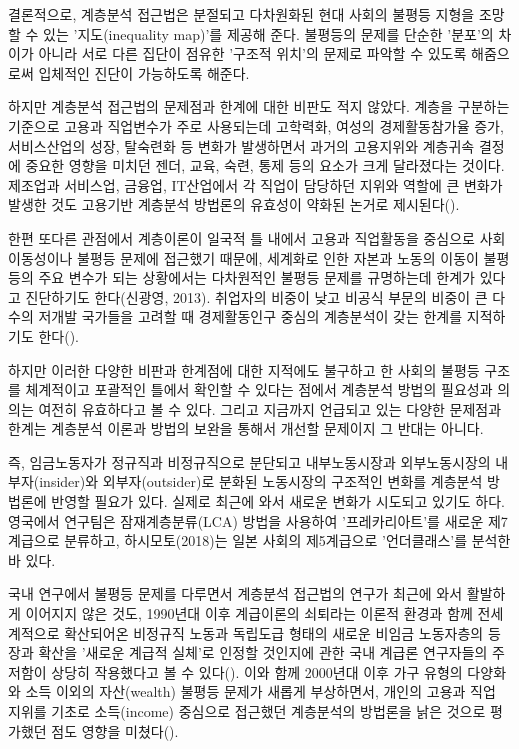 \documentclass[
  letterpaper,
  DIV=11,
  numbers=noendperiod]{scrartcl}
\begin{document}
결론적으로, 계층분석 접근법은 분절되고 다차원화된 현대 사회의 불평등
지형을 조망할 수 있는 '지도(inequality map)'를 제공해 준다. 불평등의
문제를 단순한 '분포'의 차이가 아니라 서로 다른 집단이 점유한 '구조적
위치'의 문제로 파악할 수 있도록 해줌으로써 입체적인 진단이 가능하도록
해준다.

하지만 계층분석 접근법의 문제점과 한계에 대한 비판도 적지 않았다. 계층을
구분하는 기준으로 고용과 직업변수가 주로 사용되는데 고학력화, 여성의
경제활동참가율 증가, 서비스산업의 성장, 탈숙련화 등 변화가 발생하면서
과거의 고용지위와 계층귀속 결정에 중요한 영향을 미치던 젠더, 교육, 숙련,
통제 등의 요소가 크게 달라졌다는 것이다. 제조업과 서비스업, 금융업,
IT산업에서 각 직업이 담당하던 지위와 역할에 큰 변화가 발생한 것도
고용기반 계층분석 방법론의 유효성이 약화된 논거로
제시된다().

한편 또다른 관점에서 계층이론이 일국적 틀 내에서 고용과 직업활동을
중심으로 사회이동성이나 불평등 문제에 접근했기 때문에, 세계화로 인한
자본과 노동의 이동이 불평등의 주요 변수가 되는 상황에서는 다차원적인
불평등 문제를 규명하는데 한계가 있다고 진단하기도 한다(신광영, 2013).
취업자의 비중이 낮고 비공식 부문의 비중이 큰 다수의 저개발 국가들을
고려할 때 경제활동인구 중심의 계층분석이 갖는 한계를 지적하기도
한다().

하지만 이러한 다양한 비판과 한계점에 대한 지적에도 불구하고 한 사회의
불평등 구조를 체계적이고 포괄적인 틀에서 확인할 수 있다는 점에서
계층분석 방법의 필요성과 의의는 여전히 유효하다고 볼 수 있다. 그리고
지금까지 언급되고 있는 다양한 문제점과 한계는 계층분석 이론과 방법의
보완을 통해서 개선할 문제이지 그 반대는 아니다.

즉, 임금노동자가 정규직과 비정규직으로 분단되고 내부노동시장과
외부노동시장의 내부자(insider)와 외부자(outsider)로 분화된 노동시장의
구조적인 변화를 계층분석 방법론에 반영할 필요가 있다. 실제로 최근에 와서
새로운 변화가 시도되고 있기도 하다. 영국에서 연구팀은 잠재계층분류(LCA)
방법을 사용하여 '프레카리아트'를 새로운 제7계급으로 분류하고,
하시모토(2018)는 일본 사회의 제5계급으로 '언더클래스'를 분석한 바 있다.

국내 연구에서 불평등 문제를 다루면서 계층분석 접근법의 연구가 최근에
와서 활발하게 이어지지 않은 것도, 1990년대 이후 계급이론의 쇠퇴라는
이론적 환경과 함께 전세계적으로 확산되어온 비정규직 노동과 독립도급
형태의 새로운 비임금 노동자층의 등장과 확산을 '새로운 계급적 실체'로
인정할 것인지에 관한 국내 계급론 연구자들의 주저함이 상당히 작용했다고
볼 수 있다(). 이와 함께 2000년대
이후 가구 유형의 다양화와 소득 이외의 자산(wealth) 불평등 문제가 새롭게
부상하면서, 개인의 고용과 직업 지위를 기초로 소득(income) 중심으로
접근했던 계층분석의 방법론을 낡은 것으로 평가했던 점도 영향을
미쳤다().
\end{document}
